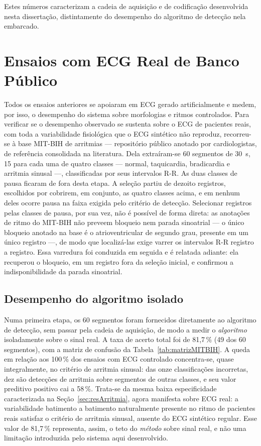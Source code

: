 Estes números caracterizam a cadeia de aquisição e de codificação desenvolvida nesta dissertação, distintamente do desempenho do algoritmo de detecção nela embarcado.

\section{Ensaios com ECG Real de Banco Público}
\label{sec:resMITBIH}

Todos os ensaios anteriores se apoiaram em \acs{ECG} gerado artificialmente e medem, por isso, o desempenho do sistema sobre morfologias e ritmos controlados. Para verificar se o desempenho observado se sustenta sobre o \acs{ECG} de pacientes reais, com toda a variabilidade fisiológica que o \acs{ECG} sintético não reproduz, recorreu-se à base MIT-BIH de arritmias — repositório público anotado por cardiologistas, de referência consolidada na literatura. Dela extraíram-se 60 segmentos de 30~s, 15 para cada uma de quatro classes — normal, taquicardia, bradicardia e arritmia sinusal —, classificadas por seus intervalos R-R. As duas classes de pausa ficaram de fora desta etapa. A seleção partiu de dezoito registros, escolhidos por cobrirem, em conjunto, as quatro classes acima, e em nenhum deles ocorre pausa na faixa exigida pelo critério de detecção. Selecionar registros pelas classes de pausa, por sua vez, não é possível de forma direta: as anotações de ritmo do MIT-BIH não preveem bloqueio nem parada sinoatrial --- o único bloqueio anotado na base é o atrioventricular de segundo grau, presente em um único registro ---, de modo que localizá-las exige varrer os intervalos R-R registro a registro. Essa varredura foi conduzida em seguida e é relatada adiante: ela recuperou o bloqueio, em um registro fora da seleção inicial, e confirmou a indisponibilidade da parada sinoatrial.

\subsection{Desempenho do algoritmo isolado}
\label{sec:resMitbihAlgoritmo}

Numa primeira etapa, os 60 segmentos foram fornecidos diretamente ao algoritmo de detecção, sem passar pela cadeia de aquisição, de modo a medir o \emph{algoritmo} isoladamente sobre o sinal real. A taxa de acerto total foi de 81,7\,\% (49 dos 60 segmentos), com a matriz de confusão da Tabela~\ref{tab:matrizMITBIH}. A queda em relação aos 100\,\% dos ensaios com \acs{ECG} controlado concentra-se, quase integralmente, no critério de arritmia sinusal: das onze classificações incorretas, dez são detecções de arritmia sobre segmentos de outras classes, e seu valor preditivo positivo cai a 58\,\%. Trata-se da mesma baixa especificidade caracterizada na Seção~\ref{sec:resArritmia}, agora manifesta sobre \acs{ECG} real: a variabilidade batimento a batimento naturalmente presente no ritmo de pacientes reais satisfaz o critério de arritmia sinusal, ausente do \acs{ECG} sintético regular. Esse valor de 81,7\,\% representa, assim, o teto do \emph{método} sobre sinal real, e não uma limitação introduzida pelo sistema aqui desenvolvido.

